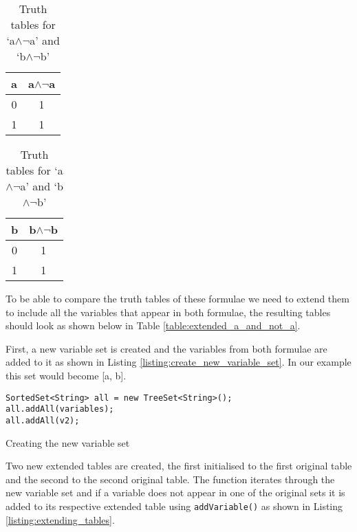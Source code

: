 \documentclass{report}
\begin{document}
\begin{table}[h]
  \begin{center}
\begin{tabular}{ || c || c || }
      \hline
      a & a$\land\lnot$a \\ \hline
      0 & 1 \\
      1 & 1 \\
      \hline
\end{tabular}
\hspace{15mm}
\begin{tabular}{ || c || c || }
      \hline
      b & b$\land\lnot$b \\ \hline
      0 & 1 \\
      1 & 1 \\
      \hline
\end{tabular}
  \end{center}
  \caption{Truth tables for `a$\land\lnot$a' and `b$\land\lnot$b'}
  \label{table:a_and_not_a}
\end{table}

To be able to compare the truth tables of these formulae we need to extend them to include all the variables that appear in both formulae, the resulting tables should look as shown below in Table \ref{table:extended_a_and_not_a}.


First, a new variable set is created and the variables from both formulae are added to it as shown in Listing \ref{listing:create_new_variable_set}. In our example this set would become [a, b].

\begin{listing}[ht]
\begin{verbatim} 
SortedSet<String> all = new TreeSet<String>();
all.addAll(variables);
all.addAll(v2);
\end{verbatim}
\caption{Creating the new variable set}
\label{listing:create_new_variable_set}
\end{listing}

Two new extended tables are created, the first initialised to the first original table and the second to the second original table. The function iterates through the new variable set and if a variable does not appear in one of the original sets it is added to its respective extended table using {\tt addVariable()} as shown in Listing \ref{listing:extending_tables}. 
\end{document}
